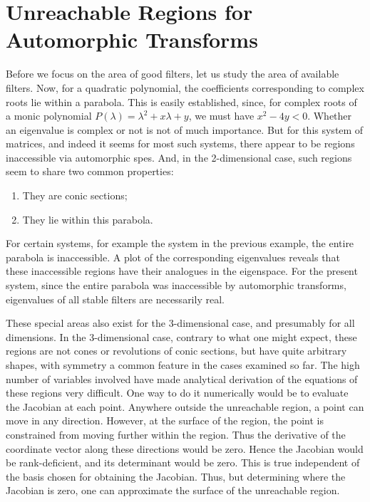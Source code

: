 \section{Unreachable Regions for Automorphic Transforms}
\label{sec:un}
Before we focus on the area of good filters, let us study the area of 
available filters.
Now, for a quadratic polynomial, the coefficients corresponding to
complex roots lie within a parabola. This is easily established, 
since, for complex roots of a monic polynomial 
$P(\lambda) = \lambda^2 + x\lambda + y$, we must have
$x^2 - 4y < 0$. Whether an eigenvalue is complex or not is not of
much importance. But for this system of matrices, and indeed it seems for
most such systems, there appear to be regions inaccessible via 
automorphic \glspl{spe}. And, in the 2-dimensional case, such 
regions seem to share two common properties: 
\begin{enumerate}
\item They are conic sections;
\item They lie within this parabola.
\end{enumerate}
For certain systems, for example the system in the previous example,
the entire parabola is inaccessible. A plot of the corresponding
eigenvalues reveals that these inaccessible regions have their 
analogues in the eigenspace. For the present system, since the entire
parabola was inaccessible by automorphic transforms, eigenvalues of all
stable filters are necessarily real.

These special areas also exist for the 3-dimensional case, and
presumably for all dimensions. In the 3-dimensional case, contrary 
to what one might expect, these regions are not cones or
revolutions of conic sections, but have quite arbitrary shapes, with 
symmetry a common feature in the cases examined so far.
The high number of variables involved have made analytical derivation 
of the equations of these regions very difficult. One way to do it 
numerically would be to evaluate the Jacobian at each point. Anywhere 
outside the unreachable region, a point can move in any direction. 
However, at the surface of the region, the point is constrained from 
moving further within the region. Thus the derivative of the 
coordinate vector along these directions would be zero. Hence the 
Jacobian would be rank-deficient, and its determinant would be zero.
This is true independent of the basis chosen for obtaining the Jacobian.
Thus, but determining where the Jacobian is zero, one can approximate 
the surface of the unreachable region.

